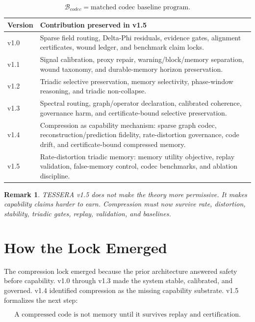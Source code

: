 \documentclass[12pt]{article}
\newtheorem{remark}{Remark}
\begin{document}
\[
\mathcal{B}_{codec}=\text{matched codec baseline program}.
\]

\begin{longtable}{p{}p{}}
\toprule
\textbf{Version} & \textbf{Contribution preserved in v1.5} \\
\midrule
v1.0 & Sparse field routing, Delta-Phi residuals, evidence gates,
alignment certificates, wound ledger, and benchmark claim locks. \\
v1.1 & Signal calibration, proxy repair, warning/block/memory separation,
wound taxonomy, and durable-memory horizon preservation. \\
v1.2 & Triadic selective preservation, memory selectivity, phase-window
reasoning, and triadic non-collapse. \\
v1.3 & Spectral routing, graph/operator declaration, calibrated coherence,
governance harm, and certificate-bound selective preservation. \\
v1.4 & Compression as capability mechanism: sparse graph codec,
reconstruction/prediction fidelity, rate-distortion governance, code drift, and
certificate-bound compressed memory. \\
v1.5 & Rate-distortion triadic memory: memory utility objective, replay
validation, false-memory control, codec benchmarks, and ablation discipline. \\
\bottomrule
\end{longtable}

\begin{remark}
TESSERA v1.5 does not make the theory more permissive. It makes capability
claims harder to earn. Compression must now survive rate, distortion, stability,
triadic gates, replay, validation, and baselines.
\end{remark}

\section{How the Lock Emerged}

The compression lock emerged because the prior architecture answered safety
before capability. v1.0 through v1.3 made the system stable, calibrated, and
governed. v1.4 identified compression as the missing capability substrate. v1.5
formalizes the next step:

\[
\boxed{
\text{A compressed code is not memory until it survives replay and certification.}
}
\]
\end{document}
